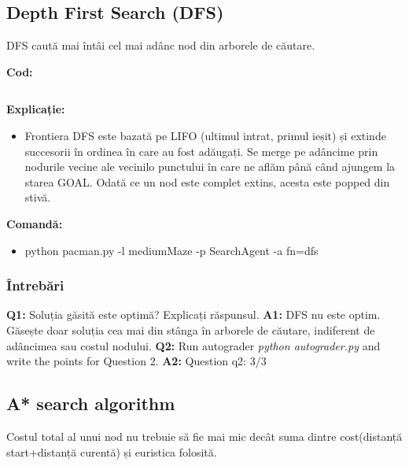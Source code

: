
\subsection{Depth First Search (DFS)}
DFS caută mai întâi cel mai adânc nod din arborele de căutare.\newline

\textbf{Cod:}
\inputminted[linenos]{python}{code/01_dfs.py}


\textbf{Explicație:}
\begin{itemize}
    \setlength\itemsep{0em}
    \item Frontiera DFS este bazată pe LIFO (ultimul intrat, primul ieșit) și extinde succesorii în ordinea în care au fost adăugați. Se merge pe adâncime prin nodurile vecine ale vecinilo punctului în care ne aflăm până când ajungem la starea GOAL.
    Odată ce un nod este complet extins, acesta este popped din stivă.

\end{itemize}


\textbf{Comandă:}
\begin{itemize}
    \setlength\itemsep{0em}
    \item python pacman.py -l mediumMaze -p SearchAgent -a fn=dfs
        
\end{itemize}

\subsubsection{Întrebări}

\textbf{Q1:} Soluția găsită este optimă? Explicați răspunsul.
\newline
\textbf{A1:} DFS nu este optim. Găsește doar soluția cea mai din stânga în arborele de căutare, indiferent de adâncimea sau costul nodului.
\newline
\newline
\textbf{Q2:} Run autograder \textit{python autograder.py} and write the points for Question 2.
\newline
\textbf{A2:} Question q2: 3/3
\newline
\vspace{0.75cm}
\pagebreak


\subsection{A* search  algorithm}
Costul total al unui nod nu trebuie să fie mai mic decât suma dintre cost(distanță start+distanță curentă) și euristica folosită. \newline


